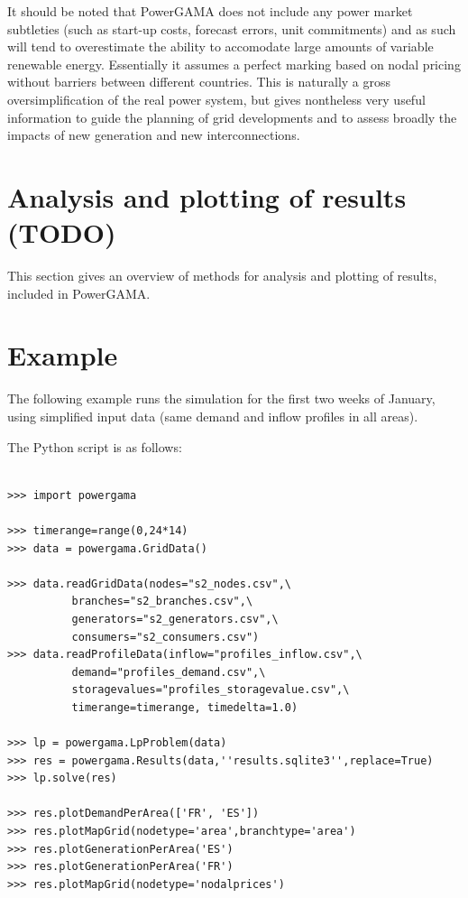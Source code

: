 \documentclass{article}
\begin{document}
It should be noted that PowerGAMA does not include any power market subtleties (such as start-up costs, forecast errors, unit commitments) and as such will tend to overestimate the ability to accomodate large amounts of variable renewable energy. Essentially it assumes a perfect marking based on nodal pricing without barriers between different countries. This is naturally a gross oversimplification of the real power system, but gives nontheless very useful information to guide the planning of grid developments and to assess broadly the impacts of new generation and new interconnections.


\section{Analysis and plotting of results (TODO)}
This section gives an overview of methods for analysis and plotting of results, included in PowerGAMA. 



\section{Example}

The following example runs the simulation for the first two weeks of January, using simplified input data (same demand and inflow profiles in all areas).

The Python script is as follows: 

\begin{lstlisting}

>>> import powergama

>>> timerange=range(0,24*14)
>>> data = powergama.GridData()

>>> data.readGridData(nodes="s2_nodes.csv",\
          branches="s2_branches.csv",\
          generators="s2_generators.csv",\
          consumers="s2_consumers.csv")
>>> data.readProfileData(inflow="profiles_inflow.csv",\
          demand="profiles_demand.csv",\
          storagevalues="profiles_storagevalue.csv",\
          timerange=timerange, timedelta=1.0)

>>> lp = powergama.LpProblem(data)
>>> res = powergama.Results(data,''results.sqlite3'',replace=True)
>>> lp.solve(res)

>>> res.plotDemandPerArea(['FR', 'ES'])
>>> res.plotMapGrid(nodetype='area',branchtype='area')
>>> res.plotGenerationPerArea('ES')
>>> res.plotGenerationPerArea('FR')
>>> res.plotMapGrid(nodetype='nodalprices')

\end{lstlisting}
\end{document}
